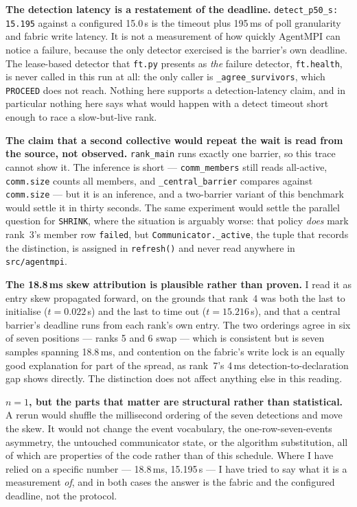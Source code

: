 \documentclass[11pt]{article}
\begin{document}
\textbf{The detection latency is a restatement of the deadline.}
\texttt{detect\_p50\_s: 15.195} against a configured 15.0\,s is the timeout plus 195\,ms
of poll granularity and fabric write latency. It is not a measurement of how quickly
AgentMPI can notice a failure, because the only detector exercised is the barrier's own
deadline. The lease-based detector that \texttt{ft.py} presents as \emph{the} failure
detector, \texttt{ft.health}, is never called in this run at all: the only caller is
\texttt{\_agree\_survivors}, which \texttt{PROCEED} does not reach. Nothing here supports
a detection-latency claim, and in particular nothing here says what would happen with a
detect timeout short enough to race a slow-but-live rank.

\textbf{The claim that a second collective would repeat the wait is read from the source,
not observed.} \texttt{rank\_main} runs exactly one barrier, so this trace cannot show it.
The inference is short --- \texttt{comm\_members} still reads all-active,
\texttt{comm.size} counts all members, and \texttt{\_central\_barrier} compares against
\texttt{comm.size} --- but it is an inference, and a two-barrier variant of this benchmark
would settle it in thirty seconds. The same experiment would settle the parallel question
for \texttt{SHRINK}, where the situation is arguably worse: that policy \emph{does} mark
rank~3's member row \texttt{failed}, but \texttt{Communicator.\_active}, the tuple that
records the distinction, is assigned in \texttt{refresh()} and never read anywhere in
\texttt{src/agentmpi}.

\textbf{The 18.8\,ms skew attribution is plausible rather than proven.} I read it as entry
skew propagated forward, on the grounds that rank~4 was both the last to initialise
($t=0.022$\,s) and the last to time out ($t=15.216$\,s), and that a central barrier's
deadline runs from each rank's own entry. The two orderings agree in six of seven
positions --- ranks 5 and 6 swap --- which is consistent but is seven samples spanning
18.8\,ms, and contention on the fabric's write lock is an equally good explanation for
part of the spread, as rank~7's 4\,ms detection-to-declaration gap shows directly. The
distinction does not affect anything else in this reading.

\textbf{$n=1$, but the parts that matter are structural rather than statistical.} A rerun
would shuffle the millisecond ordering of the seven detections and move the skew. It would
not change the event vocabulary, the one-row-seven-events asymmetry, the untouched
communicator state, or the algorithm substitution, all of which are properties of the code
rather than of this schedule. Where I have relied on a specific number --- 18.8\,ms,
15.195\,s --- I have tried to say what it is a measurement \emph{of}, and in both cases
the answer is the fabric and the configured deadline, not the protocol.
\end{document}
